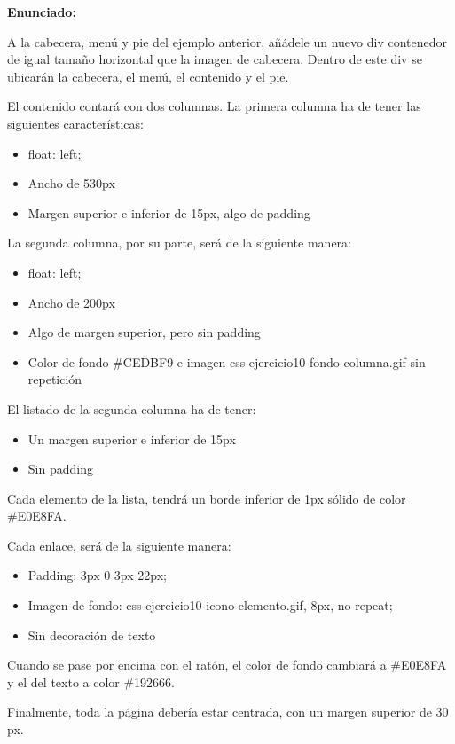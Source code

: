 \textbf{Enunciado:}

A la cabecera, menú y pie del ejemplo anterior, añádele un nuevo div contenedor de igual tamaño horizontal que la imagen de cabecera. Dentro de este div se ubicarán la cabecera, el menú, el contenido y el pie.

El contenido contará con dos columnas. La primera columna ha de tener las siguientes características:

\begin{itemize}
  \item float: left;
  \item Ancho de 530px
  \item Margen superior e inferior de 15px, algo de padding
\end{itemize}

La segunda columna, por su parte, será de la siguiente manera:

\begin{itemize}
  \item float: left;
  \item Ancho de 200px
  \item Algo de margen superior, pero sin padding
  \item Color de fondo \#CEDBF9 e imagen css-ejercicio10-fondo-columna.gif sin repetición
\end{itemize}

El listado de la segunda columna ha de tener:
\begin{itemize}
  \item Un margen superior e inferior de 15px
  \item Sin padding
\end{itemize}

Cada elemento de la lista, tendrá un borde inferior de 1px sólido de color \#E0E8FA.

Cada enlace, será de la siguiente manera:

\begin{itemize}
  \item Padding: 3px 0 3px 22px;
  \item Imagen de fondo: css-ejercicio10-icono-elemento.gif, 8px, no-repeat;
  \item Sin decoración de texto
\end{itemize}

Cuando se pase por encima con el ratón, el color de fondo cambiará a \#E0E8FA y el del texto a color \#192666.

Finalmente, toda la página debería estar centrada, con un margen superior de 30 px.

